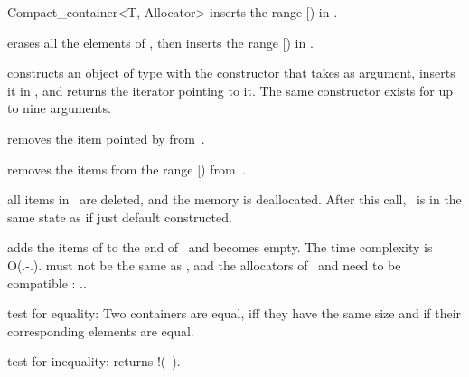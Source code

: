 \begin{ccRefClass}{Compact_container<T, Allocator>}
  {inserts the range [) in \ccVar.}

  {erases all the elements of \ccVar, then inserts the range
   [) in \ccVar.}

  {constructs an object of type  with the constructor that takes
    as argument, inserts it in \ccVar, and returns the iterator pointing
   to it. The same constructor exists for up to nine arguments.}


  {removes the item pointed by  from~\ccVar.}

  {removes the items from the range [) from~\ccVar.}

  {all items in \ccVar\ are deleted, and the memory is deallocated.
   After this call, \ccVar\ is in the same state as if just default
   constructed.}



  {adds the items of  to the end of \ccVar\ and  becomes empty.
   The time complexity is O(\ccVar.-\ccVar.).
   \ccPrecond {} must not be the same as \ccVar,
   and the allocators of \ccVar\ and  need to be compatible :
   \ccVar..}


  {test for equality: Two containers are equal, iff they have the
   same size and if their corresponding elements are equal.}

  {test for inequality: returns !(\ccVar\ ).}


\end{ccRefClass}
